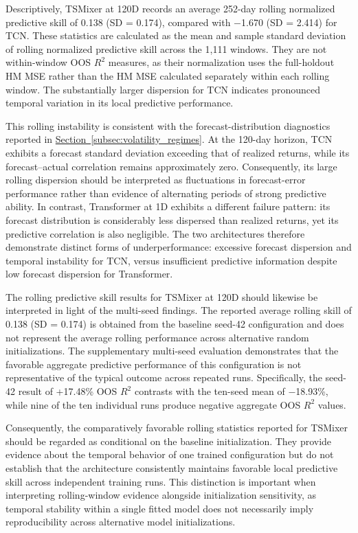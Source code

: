 \documentclass[12pt,twoside]{ord}
\begin{document}
Descriptively, TSMixer at 120D records an average 252-day rolling normalized predictive skill of 0.138 (SD = 0.174), compared with $-$1.670 (SD = 2.414) for TCN. These statistics are calculated as the mean and sample standard deviation of rolling normalized predictive skill across the 1,111 windows. They are not within-window OOS $R^2$ measures, as their normalization uses the full-holdout HM MSE rather than the HM MSE calculated separately within each rolling window. The substantially larger dispersion for TCN indicates pronounced temporal variation in its local predictive performance.

This rolling instability is consistent with the forecast-distribution diagnostics reported in \hyperref[subsec:volatility_regimes]{Section~\ref*{subsec:volatility_regimes}}. At the 120-day horizon, TCN exhibits a forecast standard deviation exceeding that of realized returns, while its forecast--actual correlation remains approximately zero. Consequently, its large rolling dispersion should be interpreted as fluctuations in forecast-error performance rather than evidence of alternating periods of strong predictive ability. In contrast, Transformer at 1D exhibits a different failure pattern: its forecast distribution is considerably less dispersed than realized returns, yet its predictive correlation is also negligible. The two architectures therefore demonstrate distinct forms of underperformance: excessive forecast dispersion and temporal instability for TCN, versus insufficient predictive information despite low forecast dispersion for Transformer.

The rolling predictive skill results for TSMixer at 120D should likewise be interpreted in light of the multi-seed findings. The reported average rolling skill of 0.138 (SD = 0.174) is obtained from the baseline seed-42 configuration and does not represent the average rolling performance across alternative random initializations. The supplementary multi-seed evaluation demonstrates that the favorable aggregate predictive performance of this configuration is not representative of the typical outcome across repeated runs. Specifically, the seed-42 result of +17.48\% OOS $R^2$ contrasts with the ten-seed mean of $-$18.93\%, while nine of the ten individual runs produce negative aggregate OOS $R^2$ values.

Consequently, the comparatively favorable rolling statistics reported for TSMixer should be regarded as conditional on the baseline initialization. They provide evidence about the temporal behavior of one trained configuration but do not establish that the architecture consistently maintains favorable local predictive skill across independent training runs. This distinction is important when interpreting rolling-window evidence alongside initialization sensitivity, as temporal stability within a single fitted model does not necessarily imply reproducibility across alternative model initializations.
\end{document}
